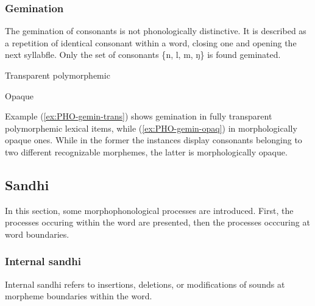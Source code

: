 \subsubsection{Gemination}
\label{sec:PHO-gemination}

The gemination of consonants is not phonologically distinctive. It  is 
described as a repetition of identical consonant within a word, closing one and 
opening the next  syllabfle. Only the set of consonants \{{\sls n, l, m, ŋ}\} is 
found 
geminated.  




\begin{exe}
	
	\ex\label{ex:PHO-gemin-trans}{\rm Transparent polymorphemic}
	\begin{xlist}
	      
	   
	    
			\end{xlist}	
		
	\ex\label{ex:PHO-gemin-opaq}{\rm Opaque}
		\begin{xlist}
	 \quad  {\rm `fist'}
	  \quad {\rm `be worse'}
	 \quad {\rm  `pepper'}
		\end{xlist}
\end{exe}


Example (\ref{ex:PHO-gemin-trans})  shows   gemination in fully 
transparent  polymorphemic lexical items, while (\ref{ex:PHO-gemin-opaq})  in 
morphologically opaque ones. While in the former the instances display 
consonants belonging to two different recognizable morphemes, the latter is 
morphologically opaque. 


\subsection{Sandhi}
\label{sec:sandhi}

In this section,  some morphophonological processes are introduced. First,
the  processes occuring within the word are presented, then the processes
occcuring at word
boundaries. 

\subsubsection{Internal sandhi}
\label{sec:internal-sandhi}
Internal sandhi  refers to insertions, deletions,  or modifications of sounds
at morpheme boundaries within the word. 


